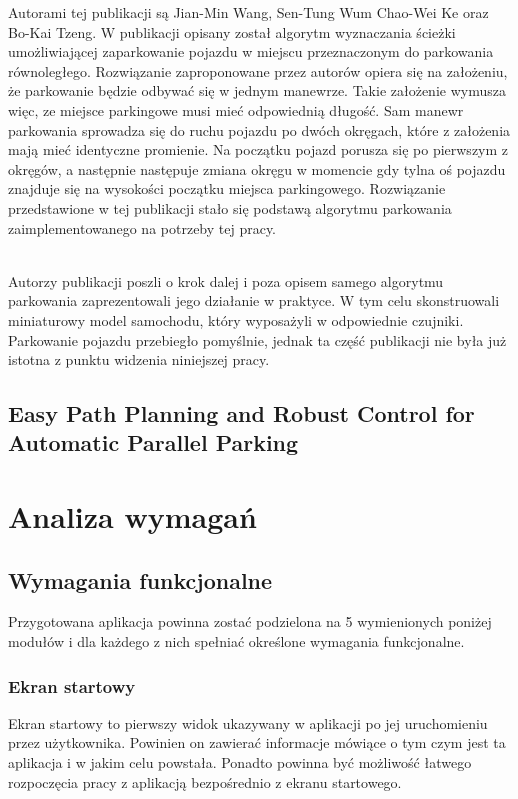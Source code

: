 \documentclass[a4paper,11pt,twoside]{report}
\theoremstyle{definition}
\begin{document}
Autorami tej publikacji są Jian-Min Wang, Sen-Tung Wum Chao-Wei Ke oraz Bo-Kai Tzeng. W publikacji opisany został algorytm wyznaczania ścieżki umożliwiającej zaparkowanie pojazdu w miejscu przeznaczonym do parkowania równoległego. Rozwiązanie zaproponowane przez autorów opiera się na założeniu, że parkowanie będzie odbywać się w jednym manewrze. Takie założenie wymusza więc, ze miejsce parkingowe musi mieć odpowiednią długość. Sam manewr parkowania sprowadza się do ruchu pojazdu po dwóch okręgach, które z założenia mają mieć identyczne promienie. Na początku pojazd porusza się po pierwszym z okręgów, a następnie następuje zmiana okręgu w momencie gdy tylna oś pojazdu znajduje się na wysokości początku miejsca parkingowego. Rozwiązanie przedstawione w tej publikacji stało się podstawą algorytmu parkowania zaimplementowanego na potrzeby tej pracy.
 
~\\Autorzy publikacji poszli o krok dalej i poza opisem samego algorytmu parkowania zaprezentowali jego działanie w praktyce. W tym celu skonstruowali miniaturowy model samochodu, który wyposażyli w odpowiednie czujniki. Parkowanie pojazdu przebiegło pomyślnie, jednak ta część publikacji nie była już istotna z punktu widzenia niniejszej pracy.
 


\section{Easy Path Planning and Robust Control for Automatic Parallel Parking}


\chapter{Analiza wymagań}

\section{Wymagania funkcjonalne}

Przygotowana aplikacja powinna zostać podzielona na 5 wymienionych poniżej modułów i dla każdego z nich spełniać określone wymagania funkcjonalne.

\subsection{Ekran startowy}

Ekran startowy to pierwszy widok ukazywany w aplikacji po jej uruchomieniu przez użytkownika. Powinien on zawierać informacje mówiące o tym czym jest ta aplikacja i w jakim celu powstała. Ponadto powinna być możliwość łatwego rozpoczęcia pracy z aplikacją bezpośrednio z ekranu startowego.
\end{document}
